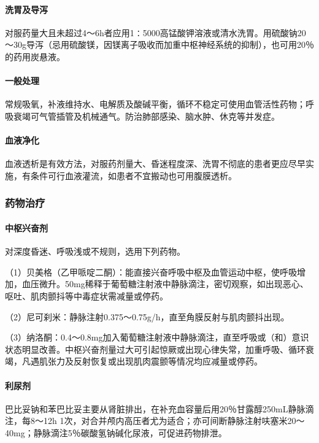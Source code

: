 \paragraph{洗胃及导泻}

对服药量大且未超过4～6h者应用1∶5000高锰酸钾溶液或清水洗胃。用硫酸钠20～30g导泻（忌用硫酸镁，因镁离子吸收而加重中枢神经系统的抑制），也可用20％的药用炭悬液。
\paragraph{一般处理}

常规吸氧，补液维持水、电解质及酸碱平衡，循环不稳定可使用血管活性药物；呼吸衰竭可气管插管及机械通气。防治肺部感染、脑水肿、休克等并发症。
\paragraph{血液净化}

血液透析是有效方法，对服药剂量大、昏迷程度深、洗胃不彻底的患者更应尽早实施，有条件可行血液灌流，如患者不宜搬动也可用腹膜透析。

\subsubsection{药物治疗}
\paragraph{中枢兴奋剂}

对深度昏迷、呼吸浅或不规则，选用下列药物。

（1）贝美格（乙甲哌啶二酮）：能直接兴奋呼吸中枢及血管运动中枢，使呼吸增加，血压微升。50mg稀释于葡萄糖注射液中静脉滴注，密切观察，如出现恶心、呕吐、肌肉颤抖等中毒症状需减量或停药。

（2）尼可刹米：静脉注射0.375～0.75g/h，直至角膜反射与肌肉颤抖出现。

（3）纳洛酮：0.4～0.8mg加入葡萄糖注射液中静脉滴注，直至呼吸或（和）意识状态明显改善。中枢兴奋剂量过大可引起惊厥或出现心律失常，加重呼吸、循环衰竭，凡遇肌张力及反射恢复或出现肌肉震颤等情况均应减量或停药。
\paragraph{利尿剂}

巴比妥钠和苯巴比妥主要从肾脏排出，在补充血容量后用20％甘露醇250mL静脉滴注，每8～12h
1次，对合并颅内高压者尤为适合；亦可间断静脉注射呋塞米20～40mg；静脉滴注5％碳酸氢钠碱化尿液，可促进药物排泄。

